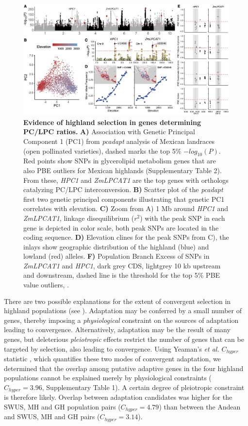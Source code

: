 \documentclass[9pt,twocolumn,twoside,lineno]{biorxiv}
\newcommand{\hpc}{\textit{HPC1}\xspace}
\begin{document}
\begin{figure}[ht]
\centering
\includegraphics[width=0.8\paperwidth]{Figures/Fig_2.png}
\caption{\textbf{Evidence of highland selection in genes determining PC/LPC ratios.}
 \textbf{A)} Association with Genetic Principal Component 1 (PC1) from \textit{pcadapt} analysis of Mexican landraces (open pollinated varieties), dashed marks the top 5\% $-log_{10}(P)$. 
 Red points show SNPs in glycerolipid metabolism genes that are also PBE outliers for Mexican highlands (Supplementary Table 2). 
 From these, \hpc and \textit{ZmLPCAT1} are the top genes with orthologs catalyzing PC/LPC interconversion. 
 \textbf{B)} Scatter plot of the \textit{pcadapt} first two genetic principal components illustrating that genetic PC1 correlates with elevation.
 \textbf{C)} Zoom from A) 1 Mb around \hpc and \textit{ZmLPCAT1}, linkage disequilibrium ($r^2$) with the peak SNP in each gene is depicted in color scale, both peak SNPs are located in the coding sequence. 
 \textbf{D)} Elevation clines for the peak SNPs from C), the inlays show  geographic distribution of the highland (blue) and lowland (red) alleles.
\textbf{F)} Population Branch Excess of SNPs in \textit{ZmLPCAT1} and \hpc, dark grey CDS, lightgrey 10 kb upstream and downstream, dashed line is the threshold for the top 5\% PBE value outliers, .} 
\label{Fig2}
\end{figure}

There are two possible explanations for the extent of convergent selection in highland populations (see \cite{Wang2020-mp, yeaman2018}). 
Adaptation may be conferred by a small number of genes, thereby imposing a \textit{physiological} constraint on the sources of adaptation leading to convergence. 
Alternatively, adaptation may be the result of many genes, but deleterious \textit{pleiotropic} effects restrict the number of genes that can be targeted by selection, also leading to convergence.  
Using Yeaman's \textit{et al.} $C_{hyper}$ statistic \cite{yeaman2018}, which quantifies these two modes of convergent adaptation, we determined that the overlap among putative adaptive genes in the four highland populations cannot be explained merely by physiological constraints ($C_{hyper} = 3.96$, Supplementary Table 1). 
A certain degree of pleiotropic constraint is therefore likely.
Overlap between adaptation candidates was higher for the SWUS, MH and GH population pairs ($C_{hyper} = 4.79$) than between the Andean and SWUS, MH and GH pairs ($C_{hyper} = 3.14$).
\end{document}

